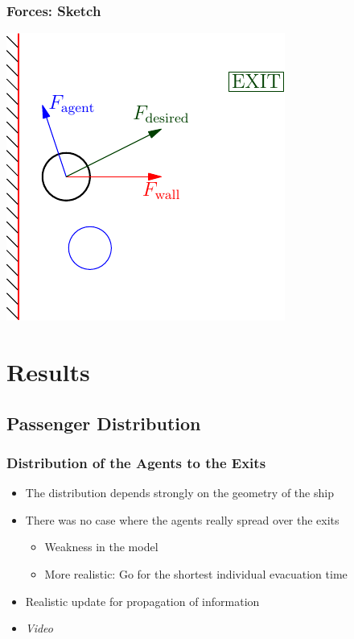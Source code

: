 \documentclass{beamer}
\begin{document}
\begin{frame}
	\frametitle{Forces: Sketch}
	\begin{center}
		\includegraphics{images/agentforces.pdf}
	\end{center}
\end{frame}

\section{Results}

\subsection{Passenger Distribution}
\begin{frame}
	\frametitle{Distribution of the Agents to the Exits}
	\begin{itemize}
		\item The distribution depends strongly on the geometry of the ship
		\item There was no case where the agents really spread over the exits
		\begin{itemize}
			\item Weakness in the model
			\item More realistic: Go for the shortest individual evacuation time
		\end{itemize}
		\item Realistic update for propagation of information
		\item \emph{Video}
	\end{itemize}
\end{frame}
\end{document}
